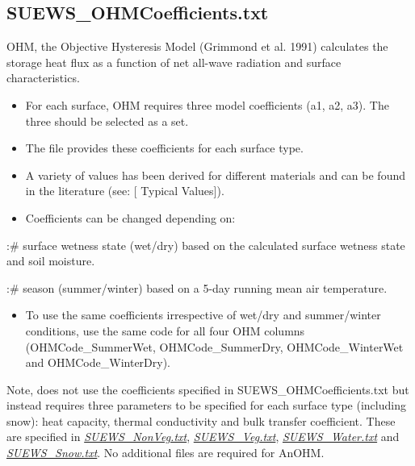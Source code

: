 \documentclass[letterpaper,10pt,english]{sphinxmanual}
\begin{document}
\subsection{SUEWS\_OHMCoefficients.txt}
\label{\detokenize{input_files/SUEWS_SiteInfo/SUEWS_OHMCoefficients::doc}}\label{\detokenize{input_files/SUEWS_SiteInfo/SUEWS_OHMCoefficients:suews-ohmcoefficients-txt}}
OHM, the Objective Hysteresis Model (Grimmond et al. 1991) \label{\detokenize{input_files/SUEWS_SiteInfo/SUEWS_OHMCoefficients:id1}}{\hyperref[\detokenize{references:g91ohm}]{\sphinxcrossref{{[}G91OHM{]}}}}
calculates the storage heat flux as a function of net all-wave radiation
and surface characteristics.
\begin{itemize}
\item {} 
For each surface, OHM requires three model coefficients (a1, a2, a3).
The three should be selected as a set.

\item {} 
The  file provides these coefficients
for each surface type.

\item {} 
A variety of values has been derived for different materials and can
be found in the literature (see:
{[}\textbar{}
Typical Values{]}).

\item {} 
Coefficients can be changed depending on:

\end{itemize}

:\# surface wetness state (wet/dry) based on the calculated surface
wetness state and soil moisture.

:\# season (summer/winter) based on a 5-day running mean air temperature.
\begin{itemize}
\item {} 
To use the same coefficients irrespective of wet/dry and
summer/winter conditions, use the same code for all four OHM columns
(OHMCode\_SummerWet, OHMCode\_SummerDry, OHMCode\_WinterWet and
OHMCode\_WinterDry).

\end{itemize}

Note,  does not use the coefficients specified in
SUEWS\_OHMCoefficients.txt but instead requires three parameters to be
specified for each surface type (including snow): heat capacity, thermal
conductivity and bulk transfer coefficient. These are specified in
{\hyperref[\detokenize{input_files/SUEWS_SiteInfo/SUEWS_OHMCoefficients:SUEWS_NonVeg.txt}]{\emph{SUEWS\_NonVeg.txt}}},
{\hyperref[\detokenize{input_files/SUEWS_SiteInfo/SUEWS_OHMCoefficients:SUEWS_Veg.txt}]{\emph{SUEWS\_Veg.txt}}},
{\hyperref[\detokenize{input_files/SUEWS_SiteInfo/SUEWS_OHMCoefficients:SUEWS_Water.txt}]{\emph{SUEWS\_Water.txt}}} and
{\hyperref[\detokenize{input_files/SUEWS_SiteInfo/SUEWS_OHMCoefficients:SUEWS_Snow.txt}]{\emph{SUEWS\_Snow.txt}}}. No additional files are required
for AnOHM.
\end{document}
